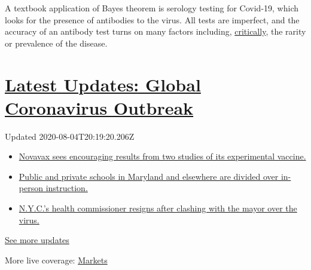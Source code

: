 A textbook application of Bayes theorem is serology testing for
Covid-19, which looks for the presence of antibodies to the virus. All
tests are imperfect, and the accuracy of an antibody test turns on many
factors including,
\href{https://www.scientificamerican.com/article/coronavirus-antibody-tests-have-a-mathematical-pitfall/}{critically},
the rarity or prevalence of the disease.

\hypertarget{latest-updates-global-coronavirus-outbreak}{%
\section{\texorpdfstring{\href{https://www.nytimes3xbfgragh.onion/2020/08/04/world/coronavirus-cases.html?action=click\&pgtype=Article\&state=default\&region=MAIN_CONTENT_1\&context=storylines_live_updates}{Latest
Updates: Global Coronavirus
Outbreak}}{Latest Updates: Global Coronavirus Outbreak}}\label{latest-updates-global-coronavirus-outbreak}}

Updated 2020-08-04T20:19:20.206Z

\begin{itemize}
\tightlist
\item
  \href{https://www.nytimes3xbfgragh.onion/2020/08/04/world/coronavirus-cases.html?action=click\&pgtype=Article\&state=default\&region=MAIN_CONTENT_1\&context=storylines_live_updates\#link-1228a480}{Novavax
  sees encouraging results from two studies of its experimental
  vaccine.}
\item
  \href{https://www.nytimes3xbfgragh.onion/2020/08/04/world/coronavirus-cases.html?action=click\&pgtype=Article\&state=default\&region=MAIN_CONTENT_1\&context=storylines_live_updates\#link-4825b93}{Public
  and private schools in Maryland and elsewhere are divided over
  in-person instruction.}
\item
  \href{https://www.nytimes3xbfgragh.onion/2020/08/04/world/coronavirus-cases.html?action=click\&pgtype=Article\&state=default\&region=MAIN_CONTENT_1\&context=storylines_live_updates\#link-4d1eafa8}{N.Y.C.'s
  health commissioner resigns after clashing with the mayor over the
  virus.}
\end{itemize}

\href{https://www.nytimes3xbfgragh.onion/2020/08/04/world/coronavirus-cases.html?action=click\&pgtype=Article\&state=default\&region=MAIN_CONTENT_1\&context=storylines_live_updates}{See
more updates}

More live coverage:
\href{https://www.nytimes3xbfgragh.onion/live/2020/08/04/business/stock-market-today-coronavirus?action=click\&pgtype=Article\&state=default\&region=MAIN_CONTENT_1\&context=storylines_live_updates}{Markets}

